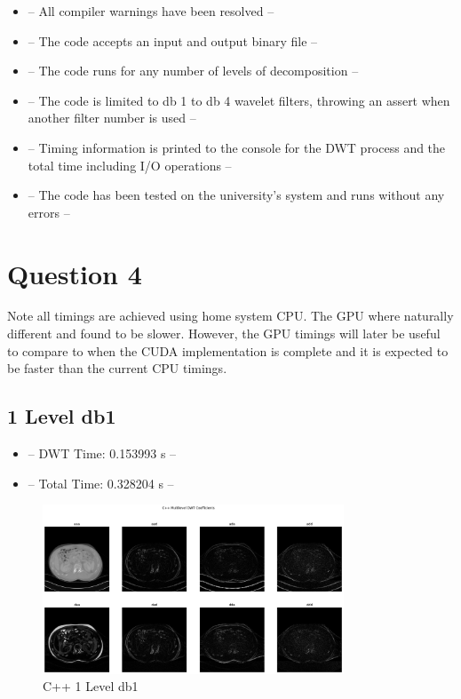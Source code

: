 \documentclass{article}
\begin{document}
\begin{itemize}
    \item -- All compiler warnings have been resolved --
    \item -- The code accepts an input and output binary file --
    \item -- The code runs for any number of levels of decomposition --
    \item -- The code is limited to db 1 to db 4 wavelet filters, throwing an assert when another filter number is used --
    \item -- Timing information is printed to the console for the DWT process and the total time including I/O operations --
    \item -- The code has been tested on the university's system and runs without any errors --
\end{itemize}

\pagebreak

\section{Question 4}

Note all timings are achieved using home system CPU. The GPU where naturally different and found to be slower. However, the GPU timings will later be useful to compare to when the CUDA implementation is complete and it is expected to be faster than the current CPU timings.\\

\subsection{1 Level db1}
\begin{itemize}
    \item -- DWT Time: 0.153993 s --
    \item -- Total Time: 0.328204 s --
\end{itemize}

\begin{figure}[H]
    \centering
    \includegraphics[width=0.8\textwidth]{assets/cpp-1-db1.png}
    \caption{C++ 1 Level db1}
    \label{fig9}
\end{figure}
\end{document}
